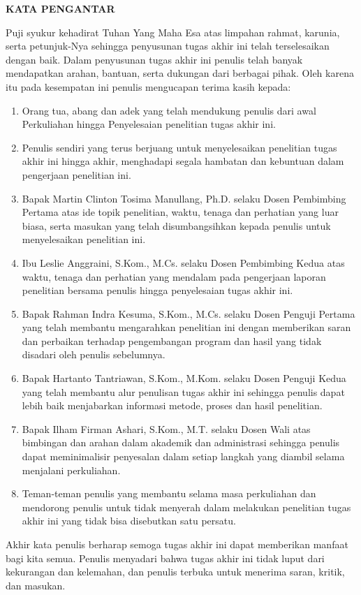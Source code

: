 \clearpage
{}%

\begin{justifying}
	\large \bfseries \centering \MakeUppercase{Kata Pengantar}\linebreak
	
	\normalsize \normalfont \justifying
	Puji syukur kehadirat Tuhan Yang Maha Esa atas limpahan rahmat, karunia, serta petunjuk-Nya sehingga penyusunan tugas akhir ini telah terselesaikan dengan baik. Dalam penyusunan tugas akhir ini penulis telah banyak mendapatkan arahan, bantuan, serta dukungan dari berbagai pihak. Oleh karena itu pada kesempatan ini penulis mengucapan terima kasih kepada: \par
	\begin{enumerate}
		\item Orang tua, abang dan adek yang telah mendukung penulis dari awal Perkuliahan hingga Penyelesaian penelitian tugas akhir ini.
		\item Penulis sendiri yang terus berjuang untuk menyelesaikan penelitian tugas akhir ini hingga akhir, menghadapi segala hambatan dan kebuntuan dalam pengerjaan penelitian ini. 
		\item Bapak Martin Clinton Tosima Manullang, Ph.D. selaku Dosen Pembimbing Pertama atas ide topik penelitian, waktu, tenaga dan perhatian yang luar biasa, serta masukan yang telah disumbangsihkan kepada penulis untuk menyelesaikan penelitian ini.
		\item Ibu Leslie Anggraini, S.Kom., M.Cs. selaku Dosen Pembimbing Kedua atas waktu, tenaga dan perhatian yang mendalam pada pengerjaan laporan penelitian bersama penulis hingga penyelesaian tugas akhir ini.
		\item Bapak Rahman Indra Kesuma, S.Kom., M.Cs. selaku Dosen Penguji Pertama yang telah membantu mengarahkan penelitian ini dengan memberikan saran dan perbaikan terhadap pengembangan program dan hasil yang tidak disadari oleh penulis sebelumnya.
		\item Bapak Hartanto Tantriawan, S.Kom., M.Kom. selaku Dosen Penguji Kedua yang telah membantu alur penulisan tugas akhir ini sehingga penulis dapat lebih baik menjabarkan informasi metode, proses dan hasil penelitian.
		\item Bapak Ilham Firman Ashari, S.Kom., M.T. selaku Dosen Wali atas bimbingan dan arahan dalam akademik dan administrasi sehingga penulis dapat meminimalisir penyesalan dalam setiap langkah yang diambil selama menjalani perkuliahan. 
		\item Teman-teman penulis yang membantu selama masa perkuliahan dan mendorong penulis untuk tidak menyerah dalam melakukan penelitian tugas akhir ini yang tidak bisa disebutkan satu persatu.
	\end{enumerate} \par
	Akhir kata penulis berharap semoga tugas akhir ini dapat memberikan manfaat bagi kita semua. Penulis menyadari bahwa tugas akhir ini tidak luput dari kekurangan dan kelemahan, dan penulis  terbuka untuk menerima saran, kritik, dan masukan.
	\vfill
	
\end{justifying}
